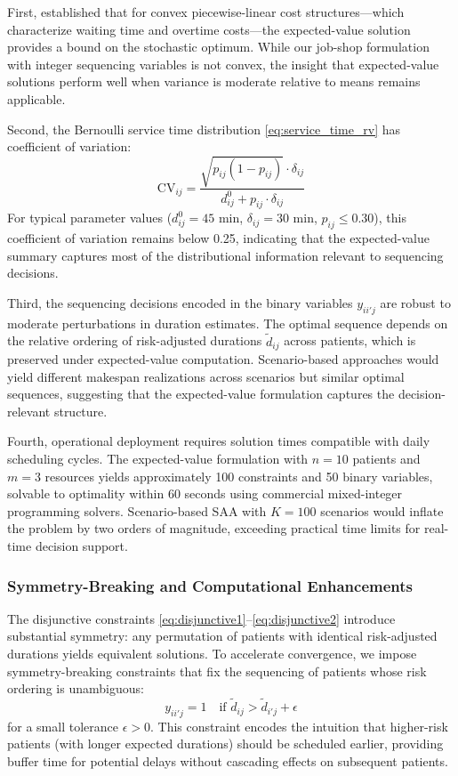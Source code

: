 \documentclass[11pt,a4paper]{article}
\begin{document}
First, \citet{denton2003sequential} established that for convex piecewise-linear cost structures---which characterize waiting time and overtime costs---the expected-value solution provides a bound on the stochastic optimum. While our job-shop formulation with integer sequencing variables is not convex, the insight that expected-value solutions perform well when variance is moderate relative to means remains applicable.

Second, the Bernoulli service time distribution \eqref{eq:service_time_rv} has coefficient of variation:
\begin{equation}
\text{CV}_{ij} = \frac{\sqrt{p_{ij}(1-p_{ij})} \cdot \delta_{ij}}{d_{ij}^0 + p_{ij} \cdot \delta_{ij}}
\end{equation}
For typical parameter values ($d_{ij}^0 = 45$ min, $\delta_{ij} = 30$ min, $p_{ij} \leq 0.30$), this coefficient of variation remains below 0.25, indicating that the expected-value summary captures most of the distributional information relevant to sequencing decisions.

Third, the sequencing decisions encoded in the binary variables $y_{ii'j}$ are robust to moderate perturbations in duration estimates. The optimal sequence depends on the relative ordering of risk-adjusted durations $\tilde{d}_{ij}$ across patients, which is preserved under expected-value computation. Scenario-based approaches would yield different makespan realizations across scenarios but similar optimal sequences, suggesting that the expected-value formulation captures the decision-relevant structure.

Fourth, operational deployment requires solution times compatible with daily scheduling cycles. The expected-value formulation with $n = 10$ patients and $m = 3$ resources yields approximately 100 constraints and 50 binary variables, solvable to optimality within 60 seconds using commercial mixed-integer programming solvers. Scenario-based SAA with $K = 100$ scenarios would inflate the problem by two orders of magnitude, exceeding practical time limits for real-time decision support.

\subsubsection{Symmetry-Breaking and Computational Enhancements}

The disjunctive constraints \eqref{eq:disjunctive1}--\eqref{eq:disjunctive2} introduce substantial symmetry: any permutation of patients with identical risk-adjusted durations yields equivalent solutions. To accelerate convergence, we impose symmetry-breaking constraints that fix the sequencing of patients whose risk ordering is unambiguous:
\begin{equation}
y_{ii'j} = 1 \quad \text{if } \tilde{d}_{ij} > \tilde{d}_{i'j} + \epsilon
\label{eq:symmetry_breaking}
\end{equation}
for a small tolerance $\epsilon > 0$. This constraint encodes the intuition that higher-risk patients (with longer expected durations) should be scheduled earlier, providing buffer time for potential delays without cascading effects on subsequent patients.
\end{document}
